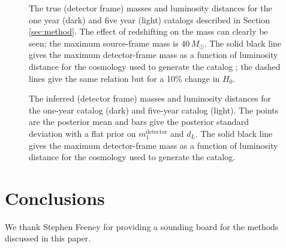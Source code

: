 \documentclass[modern]{aastex62}
\newcommand{\monedet}{m_1^\mathrm{detector}}
\newcommand{\MSourceMax}{40 \, \MSun}
\newcommand{\MSun}{M_\odot}
\begin{document}
\begin{figure}
%
  \caption{\label{fig:true-det-masses-dLs} The true (detector frame) masses and
  luminosity distances for the one year (dark) and five year (light) catalogs
  described in Section \ref{sec:method}.  The effect of redshifting on the mass
  can clearly be seen; the maximum source-frame mass is $\MSourceMax$.  The
  solid black line gives the maximum detector-frame mass as a function of
  luminosity distance for the cosmology used to generate the catalog
  \citep{Planck2016}; the dashed lines give the same relation but for a 10\%
  change in $H_0$.}
%
\end{figure}

\begin{figure}
%
  \caption{\label{fig:obs-det-masses-dLs} The inferred (detector frame) masses
  and luminosity distances for the one-year catalog (dark) and five-year catalog
  (light).  The points are the posterior mean and bars give the posterior
  standard deviation with a flat prior on $\monedet$ and $d_L$.  The solid black
  line gives the maximum detector-frame mass as a function of luminosity
  distance for the cosmology used to generate the catalog.}
%
\end{figure}

\section{Conclusions}

\acknowledgments

We thank Stephen Feeney for providing a sounding board for the methods discussed
in this paper.


\end{document}
